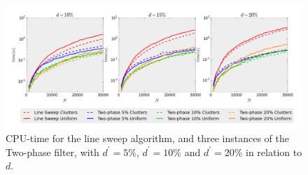 \begin{figure}[!h]  
	\vspace{-25pt}
	\centering
	\includegraphics[width=\linewidth]{Pictures/ls_bp_t} 
	\caption[CPU-time for Line Sweep and Two-phase filter algorithms.]{CPU-time for the line sweep algorithm, and three instances of the Two-phase filter, with $d^\prime=5\%$, $d^\prime=10\%$ and $d^\prime=20\%$ in relation to $d$.}
	\label{fig:ls_bp_t} 
\end{figure}